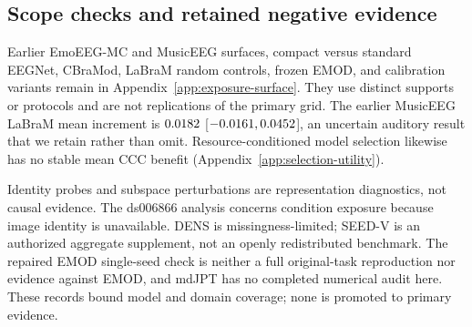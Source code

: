 \subsection{Scope checks and retained negative evidence}
Earlier EmoEEG-MC and MusicEEG surfaces, compact versus standard EEGNet,
CBraMod, LaBraM random controls, frozen EMOD, and calibration variants remain in
Appendix~\ref{app:exposure-surface}. They use distinct supports or protocols and
are not replications of the primary grid. The earlier MusicEEG LaBraM mean
increment is $0.0182$ [$-0.0161,0.0452$], an
uncertain auditory result that we retain rather than omit. Resource-conditioned
model selection likewise has no stable mean CCC benefit
(Appendix~\ref{app:selection-utility}).

Identity probes and subspace perturbations are representation diagnostics, not
causal evidence. The ds006866 analysis concerns condition exposure because
image identity is unavailable. DENS is missingness-limited; SEED-V is an
authorized aggregate supplement, not an openly redistributed benchmark. The
repaired EMOD single-seed check is neither a full original-task reproduction nor
evidence against EMOD, and mdJPT has no completed numerical audit here. These
records bound model and domain coverage; none is promoted to primary evidence.

